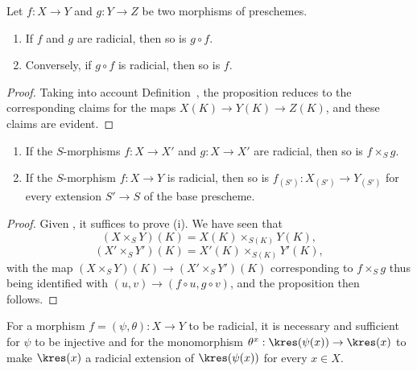 \begin{proposition}[3.5.6]
\label{I.3.5.6}
Let $f:X\to Y$ and $g:Y\to Z$ be two morphisms of preschemes.
\begin{enumerate}
  \item[{\rm(i)}] If $f$ and $g$ are radicial, then so is $g\circ f$.
  \item[{\rm(ii)}] Conversely, if $g\circ f$ is radicial, then so is $f$.
\end{enumerate}
\end{proposition}

\begin{proof}
Taking into account Definition~, the proposition reduces to the corresponding claims for the maps $X(K)\to Y(K)\to Z(K)$, and these claims are evident.
\end{proof}

\begin{proposition}[3.5.7]
\label{I.3.5.7}
\medskip\noindent
\begin{enumerate}
  \item[{\rm(i)}] If the $S$-morphisms $f:X\to X'$ and $g:X\to X'$ are radicial, then so is $f\times_S g$.
  \item[{\rm(ii)}] If the $S$-morphism $f:X\to Y$ is radicial, then so is $f_{(S')}:X_{(S')}\to Y_{(S')}$ for every extension $S'\to S$ of the base prescheme.
\end{enumerate}
\end{proposition}

\begin{proof}
Given , it suffices to prove (i).
We have seen  that
\[
  (X\times_S Y)(K)=X(K)\times_{S(K)}Y(K),
\]
\[
  (X'\times_S Y')(K)=X'(K)\times_{S(K)}Y'(K),
\]
with the map $(X\times_S Y)(K)\to(X'\times_S Y')(K)$ corresponding to $f\times_S g$ thus being identified with $(u,v)\to(f\circ u,g\circ v)$, and the proposition then follows.
\end{proof}

\begin{proposition}[3.5.8]
\label{I.3.5.8}
For a morphism $f=(\psi,\theta):X\to Y$ to be radicial, it is necessary and sufficient for $\psi$ to be injective and for the monomorphism $\theta^x:\kres(\psi(x))\to\kres(x)$ to make $\kres(x)$ a radicial extension of $\kres(\psi(x))$ for every $x\in X$.
\end{proposition}

